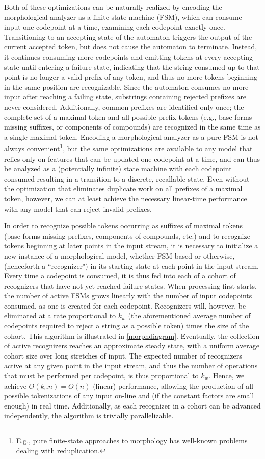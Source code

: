 Both of these optimizations can be naturally realized by encoding the morphological analyzer as a finite state machine (FSM), which can consume input one codepoint at a time, examining each codepoint exactly once. Transitioning to an accepting state of the automaton triggers the output of the current accepted token, but does not cause the automaton to terminate. Instead, it continues consuming more codepoints and emitting tokens at every accepting state until entering a failure state, indicating that the string consumed up to that point is no longer a valid prefix of any token, and thus no more tokens beginning in the same position are recognizable. Since the automaton consumes no more input after reaching a failing state, substrings containing rejected prefixes are never considered. Additionally, common prefixes are identified only once; the complete set of a maximal token and all possible prefix tokens (e.g., base forms missing suffixes, or components of compounds) are recognized in the same time as a single maximal token. Encoding a morphological analyzer as a pure FSM is not always convenient\footnote{E.g., pure finite-state approaches to morphology has well-known problems dealing with reduplication.}, but the same optimizations are available to any model that relies only on features that can be updated one codepoint at a time, and can thus be analyzed as a (potentially infinite) state machine with each codepoint consumed resulting in a transition to a discrete, recallable state. Even without the optimization that eliminates duplicate work on all prefixes of a maximal token, however, we can at least achieve the necessary linear-time performance with any model that can reject invalid prefixes.

In order to recognize possible tokens occurring as suffixes of maximal tokens (base forms missing prefixes, components of compounds, etc.) and to recognize tokens beginning at later points in the input stream, it is necessary to initialize a new instance of a morphological model, whether FSM-based or otherwise, (henceforth a ``recognizer") in its starting state at each point in the input stream. Every time a codepoint is consumed, it is thus fed into each of a cohort of recognizers that have not yet reached failure states. When processing first starts, the number of active FSMs grows linearly with the number of input codepoints consumed, as one is created for each codepoint. Recognizers will, however, be eliminated at a rate proportional to $k_w$ (the aforementioned average number of codepoints required to reject a string as a possible token) times the size of the cohort. This algorithm is illustrated in \ref{morphdiagram}. Eventually, the collection of active recognizers reaches an approximate steady state, with a uniform average cohort size over long stretches of input. The expected number of recognizers active at any given point in the input stream, and thus the number of operations that must be performed per codepoint, is thus proportional to $k_w$. Hence, we achieve $O(k_{w}n) = O(n)$ (linear) performance, allowing the production of all possible tokenizations of any input on-line and (if the constant factors are small enough) in real time. Additionally, as each recognizer in a cohort can be advanced independently, the algorithm is trivially parallelizable.

